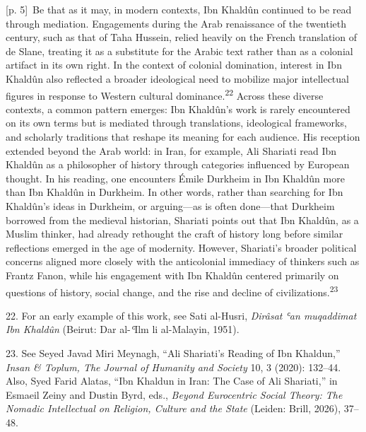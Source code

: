 \documentclass[10pt,a4paper]{article}
\begin{document}
{\scriptsize\color{gray} [p. 5]}\ Be that as it may, in modern contexts, Ibn Khaldûn continued to be read through mediation. Engagements during the Arab renaissance of the twentieth century, such as that of Taha Hussein, relied heavily on the French translation of de Slane, treating it as a substitute for the Arabic text rather than as a colonial artifact in its own right. In the context of colonial domination, interest in Ibn Khaldûn also reflected a broader ideological need to mobilize major intellectual figures in response to Western cultural dominance.\nobreak\textsuperscript{22} Across these diverse contexts, a common pattern emerges: Ibn Khaldûn’s work is rarely encountered on its own terms but is mediated through translations, ideological frameworks, and scholarly traditions that reshape its meaning for each audience. His reception extended beyond the Arab world: in Iran, for example, Ali Shariati read Ibn Khaldûn as a philosopher of history through categories influenced by European thought. In his reading, one encounters Émile Durkheim in Ibn Khaldûn more than Ibn Khaldûn in Durkheim. In other words, rather than searching for Ibn Khaldûn’s ideas in Durkheim, or arguing—as is often done—that Durkheim borrowed from the medieval historian, Shariati points out that Ibn Khaldûn, as a Muslim thinker, had already rethought the craft of history long before similar reflections emerged in the age of modernity. However, Shariati’s broader political concerns aligned more closely with the anticolonial immediacy of thinkers such as Frantz Fanon, while his engagement with Ibn Khaldûn centered primarily on questions of history, social change, and the rise and decline of civilizations.\nobreak\textsuperscript{23}\par{\small 22. For an early example of this work, see Sati al-Husri, \textit{Dirâsat ʿan muqaddimat Ibn Khaldûn} (Beirut: Dar al-\textit{ʿ}Ilm li al-Malayin, 1951).\par}{\small 23. See Seyed Javad Miri Meynagh, “Ali Shariati’s Reading of Ibn Khaldun,” \textit{Insan \& Toplum, The Journal of Humanity and Society} 10, 3 (2020): 132–44. Also, Syed Farid Alatas, “Ibn Khaldun in Iran: The Case of Ali Shariati,” in Esmaeil Zeiny and Dustin Byrd, eds., \textit{Beyond Eurocentric Social Theory: The Nomadic Intellectual on Religion, Culture and the State} (Leiden: Brill, 2026), 37–48.\par}
\end{document}
